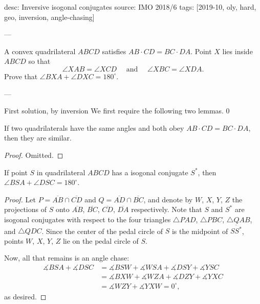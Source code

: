 desc: Inversive isogonal conjugates
source: IMO 2018/6
tags: [2019-10, oly, hard, geo, inversion, angle-chasing]

---

A convex quadrilateral $ABCD$ satisfies $AB\cdot CD=BC\cdot DA$. Point $X$ lies inside $ABCD$ so that \[\angle XAB=\angle{XCD}\quad\text{ and }\quad\angle XBC=\angle XDA.\]
Prove that $\angle BXA+\angle DXC=180^\circ$.

---

\begin{customenv}{First solution, by inversion}
    We first require the following two lemmas.
    \setcounter{boxlemma}0
    \begin{boxlemma}
        If two quadrilaterals have the same angles and both obey $AB\cdot CD=BC\cdot DA$, then they are similar.
    \end{boxlemma}
    \begin{proof}
        Omitted.
    \end{proof}
    \begin{boxlemma}
        If point $S$ in quadrilateral $ABCD$ has a isogonal conjugate $S^*$, then $\angle BSA+\angle DSC=180^\circ$.
    \end{boxlemma}
    \begin{proof}
        Let $P=\overline{AB}\cap\overline{CD}$ and $Q=\overline{AD}\cap\overline{BC}$, and denote by $W$, $X$, $Y$, $Z$ the projections of $S$ onto $\overline{AB}$, $\overline{BC}$, $\overline{CD}$, $\overline{DA}$ respectively. Note that $S$ and $S^*$ are isogonal conjugates with respect to the four triangles $\triangle PAD$, $\triangle PBC$, $\triangle QAB$, and $\triangle QDC$. Since the center of the pedal circle of $S$ is the midpoint of $\overline{SS^*}$, points $W$, $X$, $Y$, $Z$ lie on the pedal circle of $S$.

        Now, all that remains is an angle chase:
        \begin{align*}
            \measuredangle BSA+\measuredangle DSC&=\measuredangle BSW+\measuredangle WSA+\measuredangle DSY+\measuredangle YSC\\
            &=\measuredangle BXW+\measuredangle WZA+\measuredangle DZY+\measuredangle YXC\\
            &=\measuredangle WZY+\measuredangle YXW=0^\circ,
        \end{align*}
        as desired.
    \end{proof}


\end{customenv}
